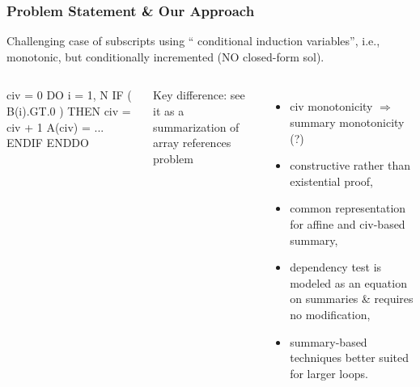 \documentclass{beamer}
\newcommand{\emp}[1]{\textcolor{DikuRed}{ #1}}
\newcommand{\emphh}[1]{\textcolor{CosGreen}{ #1}}
\begin{document}
\begin{frame}[fragile,t]
  \frametitle{Problem Statement \& Our Approach}

Challenging case of subscripts using
            ``\emp{conditional} induction variables'', i.e., 
            monotonic, but conditionally incremented 
            (NO closed-form sol).
\bigskip

\begin{columns}
\begin{colorcode}[fontsize=\small]
civ = 0
DO i = 1, N
  \emp{IF ( B(i).GT.0 )} 
  THEN
    \emp{civ = civ + 1}
    A(civ) = ...
  \emp{ENDIF}
ENDDO
\end{colorcode}
\medskip

\emphh{Key difference:} 
        see it as a summarization of array references problem
\begin{itemize}

    \item {\sc civ} monotonicity $\Rightarrow$ summary monotonicity (?)

    \item constructive rather than existential proof,

    \item common representation for affine and {\sc civ}-based summary,

    \item dependency test is modeled as an equation on 
            summaries \& requires no modification,

   \item summary-based techniques better suited for larger loops.
\end{itemize}
\end{columns}

\end{frame}
\end{document}
